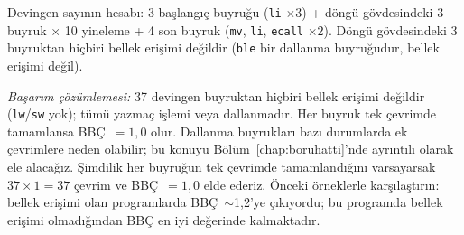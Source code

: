 \begin{ornek}[4.5]
Devingen sayının hesabı: 3 başlangıç buyruğu (\texttt{li} $\times 3$) + döngü gövdesindeki 3 buyruk $\times$ 10 yineleme + 4 son buyruk (\texttt{mv}, \texttt{li}, \texttt{ecall} $\times 2$). Döngü gövdesindeki 3 buyruktan hiçbiri bellek erişimi değildir (\texttt{ble} bir dallanma buyruğudur, bellek erişimi değil).

\emph{Başarım çözümlemesi:} 37 devingen buyruktan hiçbiri bellek erişimi değildir (\texttt{lw}/\texttt{sw} yok); tümü yazmaç işlemi veya dallanmadır. Her buyruk tek çevrimde tamamlansa BBÇ~$= 1{,}0$ olur. Dallanma buyrukları bazı durumlarda ek çevrimlere neden olabilir; bu konuyu Bölüm~\ref{chap:boruhatti}'nde ayrıntılı olarak ele alacağız. Şimdilik her buyruğun tek çevrimde tamamlandığını varsayarsak $37 \times 1 = 37$ çevrim ve BBÇ~$= 1{,}0$ elde ederiz. Önceki örneklerle karşılaştırın: bellek erişimi olan programlarda BBÇ~$\sim$1{,}2'ye çıkıyordu; bu programda bellek erişimi olmadığından BBÇ en iyi değerinde kalmaktadır.
\end{ornek}

